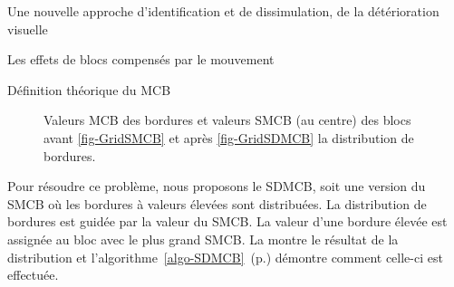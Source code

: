 \begin{chapter}{Une nouvelle approche d'identification et de dissimulation, de
la détérioration visuelle}
\begin{section}{Les effets de blocs compensés par le mouvement}
\begin{subsection}{Définition théorique du MCB}
\begin{figure}
	\label{fig-GridMCB}
	\caption[Valeurs MCB et SMCB avant et après la distribution de bordures] {Valeurs MCB des bordures et valeurs SMCB (au centre) des blocs avant
\ref{fig-GridSMCB} et après \ref{fig-GridSDMCB} la distribution de
bordures.}
\end{figure}

Pour résoudre ce problème, nous proposons le SDMCB, soit une version du SMCB où
les bordures à valeurs élevées sont distribuées. La distribution de bordures est
guidée par la valeur du SMCB. La valeur d'une bordure élevée est assignée au
bloc avec le plus grand SMCB. La  montre le résultat de la
distribution et l'algorithme~\ref{algo-SDMCB}~(p.\pageref{algo-SDMCB}) démontre
comment celle-ci est effectuée.



\end{subsection}
\end{section}
\end{chapter}
